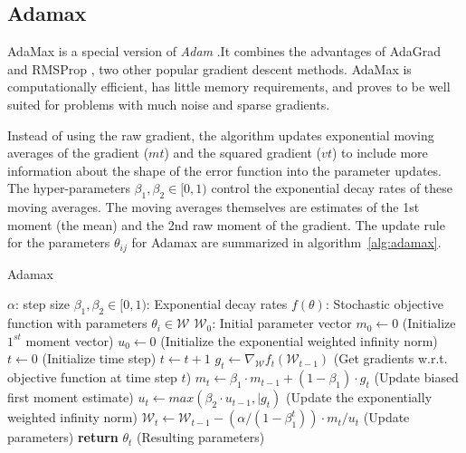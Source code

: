 \subsection{Adamax}
AdaMax is a special version 
of \textit{Adam} \cite{kingma2014adam}.It combines the advantages of AdaGrad \cite{duchi2011adaptive} and RMSProp \cite{bengio2015rmsprop},
two other popular gradient descent methods. AdaMax is computationally efficient, has little
memory requirements, and proves to be well suited for problems with much noise and sparse gradients.

Instead of using the raw gradient, the algorithm updates exponential moving averages of the gradient ($mt$) and the squared gradient
($vt$) to include more information about the shape of the error function into the parameter updates. The hyper-parameters $\beta_1, \beta_2 \in [0, 1)$ control the exponential decay rates of these moving
averages. The moving averages themselves are estimates of the 1st moment (the mean) and the
2nd raw moment of the gradient. The update rule for the parameters $\theta_{ij}$ for Adamax are summarized in 
algorithm~\ref{alg:adamax}.

\begin{algorithm}
    \caption{Adamax}
    \begin{algorithmic}[1]
        \Require $\alpha$: step size
        \Require $\beta_1, \beta_2 \in [0,1)$: Exponential decay rates
        \Require $f(\theta)$: Stochastic objective function with parameters $\theta_i \in \mathcal{W}$
        \Require $\mathcal{W}_0$: Initial parameter vector
        \State $m_0 \gets 0$ (Initialize $1^{st}$ moment vector)
        \State $u_0 \gets 0$ (Initialize the exponential weighted infinity norm)
        \State $t \gets 0$ (Initialize time step)
            \State $t\gets t+1$
            \State $g_t \gets \nabla_{\mathcal{W}}f_t(\mathcal{W}_{t-1})$ (Get gradients w.r.t. objective function at time step $t$)
            \State $m_t \gets \beta_1 \cdot m_{t-1} + (1-\beta_1) \cdot g_t$ (Update biased first moment estimate)
            \State $u_t \gets max(\beta_2 \cdot u_{t-1}, \vert{g_t})$ (Update the exponentially weighted infinity norm)
            \State $\mathcal{W}_t \gets \mathcal{W}_{t-1} - (\alpha/ (1-\beta_1^t)) \cdot m_t/u_t$ (Update parameters)
        \EndWhile
        \State \textbf{return} $\theta_t$ (Resulting parameters)
    \end{algorithmic}
    \label{alg:adamax}
\end{algorithm}

